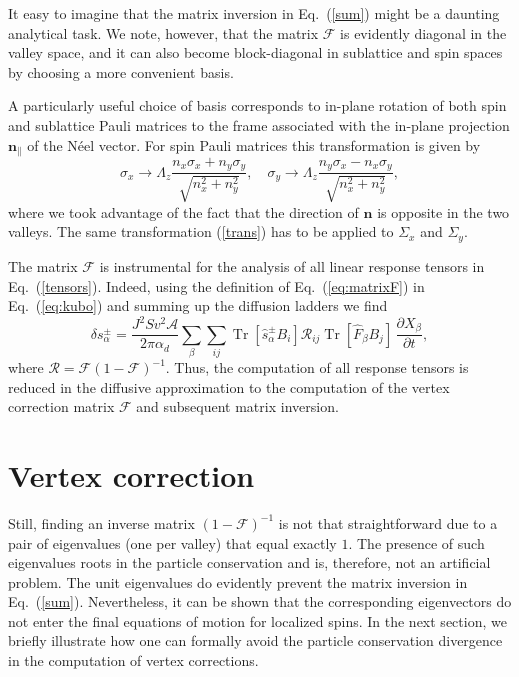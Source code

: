 \documentclass[%
  twocolumn,
  aps,
  prb,
  amsmath,
  amssymb,
  superscriptaddress,
  nofootinbib,
  floatfix
]{revtex4-1}
\newcommand{\s}{\sum\limits}
\newcommand{\pa}{\partial}
\newcommand{\be}{\begin{equation}}
\newcommand{\e}{\end{equation}}
\newcommand{\bb}{\boldsymbol}
\newcommand{\0}{^{\phantom{\dagger}}}
\DeclareMathOperator{\tr}{Tr}
\begin{document}
It easy to imagine that the matrix inversion in Eq.~(\ref{sum}) might be a daunting analytical task. We note, however, that the matrix $\mathcal{F}$ is evidently diagonal in the valley space, and it can also become block-diagonal in sublattice and spin spaces by choosing a more convenient basis. 

A particularly useful choice of basis corresponds to in-plane rotation of both spin and sublattice Pauli matrices to the frame associated with the in-plane projection $\bb{n}_\parallel$ of the N\'eel vector. For spin Pauli matrices this transformation is given by
\be
\label{trans}
\sigma_x \rightarrow \Lambda_z\frac{n_x \sigma_x + n_y \sigma_y }{\sqrt{n_x^2+n_y^2}}, \quad \sigma_y \rightarrow \Lambda_z\frac{n_y \sigma_x - n_x \sigma_y }{\sqrt{n_x^2+n_y^2}},
\e
where we took advantage of the fact that the direction of $\bb{n}$ is opposite in the two valleys. The same transformation (\ref{trans}) has to be applied to $\Sigma_{x}$ and $\Sigma_{y}$. 

The matrix $\mathcal{F}$ is instrumental for the analysis of all linear response tensors in Eq.~(\ref{tensors}). Indeed, using the definition of Eq.~(\ref{eq:matrixF}) in Eq.~(\ref{eq:kubo}) and summing up the diffusion ladders we find
\be
\label{final}
\delta s^\pm_\alpha = \frac{J^2S v^2\mathcal{A}}{2 \pi \alpha_d}
\s_\beta \s_{ij} \tr[\hat{s}^\pm_\alpha B_i] \mathcal{R}_{ij} \tr[\hat{F}_\beta B_j] \,\frac{\pa X_\beta}{\pa t},
\e
where $\mathcal{R}=\mathcal{F}(1-\mathcal{F})^{-1}$. Thus, the computation of all response tensors is reduced in the diffusive approximation to the computation of the vertex correction matrix $\mathcal{F}$ and subsequent matrix inversion.  

\section{Vertex correction}\label{sec:appc}

Still, finding an inverse matrix $(1-\mathcal{F})^{-1}$ is not that straightforward due to a pair of eigenvalues (one per valley) that equal exactly $1$. The presence of such eigenvalues roots in the particle conservation and is, therefore, not an artificial problem. The unit eigenvalues do evidently prevent the matrix inversion in Eq.~(\ref{sum}). Nevertheless, it can be shown that the corresponding eigenvectors do not enter the final equations of motion for localized spins. In the next section, we briefly illustrate how one can formally avoid the particle conservation divergence in the computation of vertex corrections.
\end{document}
